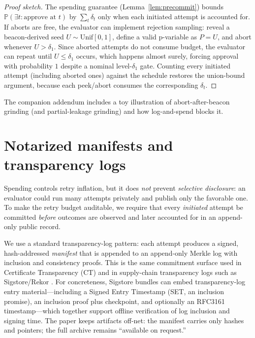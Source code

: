 \documentclass[11pt]{article}
\newcommand{\Pp}{\mathbb{P}}
\begin{document}
\begin{proof}[Proof sketch]
The spending guarantee (Lemma~\ref{lem:precommit}) bounds $\Pp(\exists t:\text{approve at }t)$ by $\sum_t\delta_t$ only when each initiated attempt is accounted for.
If aborts are free, the evaluator can implement rejection sampling: reveal a beacon-derived seed $U\sim\mathrm{Unif}[0,1]$, define a valid p-variable as $P=U$, and abort whenever $U>\delta_1$.
Since aborted attempts do not consume budget, the evaluator can repeat until $U\le\delta_1$ occurs, which happens almost surely, forcing approval with probability $1$ despite a nominal level-$\delta_1$ gate.
Counting every initiated attempt (including aborted ones) against the schedule restores the union-bound argument, because each peek/abort consumes the corresponding $\delta_t$.
\end{proof}


The companion addendum includes a toy illustration of abort-after-beacon grinding (and partial-leakage grinding) and how log-and-spend blocks it. \cite{series:evalnotaryaddendum}





\section{Notarized manifests and transparency logs}
Spending controls retry inflation, but it does \emph{not} prevent \emph{selective disclosure}: an evaluator could run many attempts privately and publish only the favorable one.
To make the retry budget auditable, we require that every \emph{initiated} attempt be committed \emph{before} outcomes are observed and later accounted for in an append-only public record.

We use a standard transparency-log pattern: each attempt produces a signed, hash-addressed \emph{manifest} that is appended to an append-only Merkle log with inclusion and consistency proofs.
This is the same commitment surface used in Certificate Transparency (CT) \cite{rfc9162} and in supply-chain transparency logs such as Sigstore/Rekor \cite{newman2022sigstore}.
For concreteness, Sigstore bundles can embed transparency-log entry material---including a Signed Entry Timestamp (SET, an inclusion promise), an inclusion proof plus checkpoint, and optionally an RFC3161 timestamp---which together support offline verification of log inclusion and signing time.\cite{sigstore_bundle_spec,sigstore_threat_model}
The paper keeps artifacts off-net: the manifest carries only hashes and pointers; the full archive remains ``available on request.''
\end{document}
